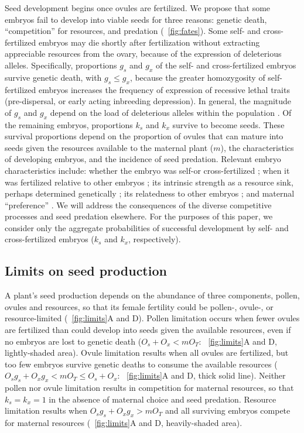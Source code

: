 \documentclass[letterpaper,titlepage]{scrartcl}
\begin{document}
Seed development begins once ovules are fertilized. We propose that
some embryos fail to develop into viable seeds for three reasons:
genetic death, ``competition'' for resources, and predation
({\fref}~\ref{fig:fates}). Some self- and cross-fertilized embryos may
die shortly after fertilization without extracting appreciable
resources from the ovary, because of the expression of deleterious
alleles. Specifically, proportions $g_{s}$ and $g_{x}$ of the self-
and cross-fertilized embryos survive genetic death, with $g_{s}\leq
g_{x}$, because the greater homozygosity of self-fertilized embryos
increases the frequency of expression of recessive lethal traits
(pre-dispersal, or early acting inbreeding depression). In general,
the magnitude of $g_{s}$ and $g_{x}$ depend on the load of deleterious
alleles within the population \citep{Charlesworth87,Klekowski88}. Of
the remaining embryos, proportions $k_{s}$ and $k_{x}$ survive to
become seeds. These survival proportions depend on the proportion of
ovules that can mature into seeds given the resources available to the
maternal plant ($m$), the characteristics of developing embryos, and
the incidence of seed predation. Relevant embryo characteristics
include: whether the embryo was self-or cross-fertilized
\citep{Husband96}; when it was fertilized relative to other embryos
\citep{UmaShaanker95}; its intrinsic strength as a resource sink, perhaps
determined genetically \citep{Rigney95}; its relatedness to other embryos
\citetext{sibling rivalry and kin selection:
  \citealp{Kress81,UmaShaanker88}}; and maternal ``preference''
\citetext{offspring choice:
  \citealp{Casper88,Marshall88,Melser01}}. We will address the
consequences of the diverse competitive processes and seed predation
elsewhere. For the purposes of this paper, we consider only the
aggregate probabilities of successful development by self- and
cross-fertilized embryos ($k_{s}$ and $k_{x}$, respectively).

\subsection{Limits on seed production}
A plant's seed production depends on the abundance of three
components, pollen, ovules and resources, so that its female fertility
could be pollen-, ovule-, or resource-limited ({\fref}~\ref{fig:limits}A and
D). Pollen limitation occurs when fewer ovules are fertilized than
could develop into seeds given the available resources, even if no
embryos are lost to genetic death ($O_{s}+O_{x}<mO_{T}$:
{\fref}~\ref{fig:limits}A and D, lightly-shaded area). Ovule
limitation results when all ovules are fertilized, but too few embryos
survive genetic deaths to consume the available resources
($O_{s}g_{s}+O_{x}g_{x}<mO_{T}\leq O_{s}+O_{x}$:
{\fref}~\ref{fig:limits}A and D, thick solid line). Neither pollen nor
ovule limitation results in competition for maternal resources, so
that $k_{s}=k_{x}=1$ in the absence of maternal choice and seed
predation. Resource limitation results when
$O_{s}g_{s}+O_{x}g_{x}>mO_{T}$ and all surviving embryos compete for
maternal resources ({\fref}~\ref{fig:limits}A and D, heavily-shaded
area).
\end{document}

